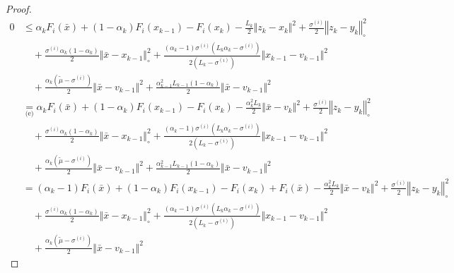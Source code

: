 \documentclass[12pt]{article}
\begin{document}
\begin{proof}
        {\allowdisplaybreaks
        \begin{align*}
            0 &\le 
            \alpha_k F_i(\bar x) + (1 - \alpha_k)F_i(x_{k - 1}) - F_i(x_k)     
                - \frac{L_k}{2}\Vert z_k - x_k\Vert^2 
                + \frac{\sigma^{(i)}}{2}\left\Vert z_k - y_k\right\Vert^2_\circ
                    \\&\quad 
                    + \frac{\sigma^{(i)}\alpha_k(1 - \alpha_k)}{2}\Vert \bar x - x_{k - 1}\Vert^2_\circ
                    + \frac{(\alpha_k - 1)\sigma^{(i)}\left(L_k\alpha_k - \sigma^{(i)}\right)}{2\left(L_k - \sigma^{(i)}\right)}
                    \Vert x_{k - 1} - v_{k - 1} \Vert^2
                    \\ &\quad 
                    + \frac{\alpha_k(\tilde\mu - \sigma^{(i)})}{2} \Vert \bar x - v_{k - 1}\Vert^2
                    + \frac{\alpha_{k - 1}^2L_{k - 1}(1 - \alpha_k)}{2} \Vert \bar x - v_{k - 1}\Vert^2
            \\
            &\underset{\text{(e)}}{=} 
            \alpha_k F_i(\bar x) + (1 - \alpha_k)F_i(x_{k - 1}) - F_i(x_k)     
            - \frac{\alpha_k^2L_k}{2}\Vert \bar x - v_k\Vert^2 
            + \frac{\sigma^{(i)}}{2}\left\Vert z_k - y_k\right\Vert^2_\circ
                \\&\quad 
                + \frac{\sigma^{(i)}\alpha_k(1 - \alpha_k)}{2}\Vert \bar x - x_{k - 1}\Vert^2_\circ
                + \frac{(\alpha_k - 1)\sigma^{(i)}\left(L_k\alpha_k - \sigma^{(i)}\right)}{2\left(L_k - \sigma^{(i)}\right)}
                \Vert x_{k - 1} - v_{k - 1} \Vert^2
                \\ &\quad 
                + \frac{\alpha_k(\tilde\mu - \sigma^{(i)})}{2} \Vert \bar x - v_{k - 1}\Vert^2
                + \frac{\alpha_{k - 1}^2L_{k - 1}(1 - \alpha_k)}{2} \Vert \bar x - v_{k - 1}\Vert^2
            \\
            &= 
            (\alpha_k - 1) F_i(\bar x) + (1 - \alpha_k)F_i(x_{k - 1}) - F_i(x_k) + F_i(\bar x)
            - \frac{\alpha_k^2L_k}{2}\Vert \bar x - v_k\Vert^2 
            + \frac{\sigma^{(i)}}{2}\left\Vert z_k - y_k\right\Vert^2_\circ
                \\&\quad 
                + \frac{\sigma^{(i)}\alpha_k(1 - \alpha_k)}{2}\Vert \bar x - x_{k - 1}\Vert^2_\circ
                + \frac{(\alpha_k - 1)\sigma^{(i)}\left(L_k\alpha_k - \sigma^{(i)}\right)}{2\left(L_k - \sigma^{(i)}\right)}\Vert x_{k - 1} - v_{k - 1} \Vert^2
                \\ &\quad 
                + \frac{\alpha_k(\tilde\mu - \sigma^{(i)})}{2} \Vert \bar x - v_{k - 1}\Vert^2

\end{align*}}
\end{proof}
\end{document}
